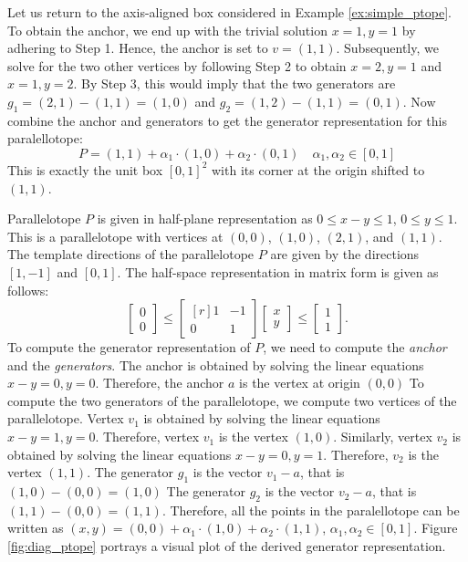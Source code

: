 \begin{example}
Let us return to the axis-aligned box considered in Example \ref{ex:simple_ptope}.
%
To obtain the anchor, we end up with the trivial solution $x = 1, y=1$ by adhering to Step 1. Hence, the anchor is set to $v = (1,1)$.
%
Subsequently, we solve for the two other vertices by following Step 2 to obtain $x=2, y= 1$ and $x=1,y=2$.
%
By Step 3, this would imply that the two generators are $g_1 = (2,1)-(1,1) = (1,0)$ and $g_2 = (1,2)-(1,1) = (0,1)$.
%
Now combine the anchor and generators to get the generator representation for this paralellotope:
%
\begin{equation}
 P = (1,1) + \alpha_1\cdot(1,0) + \alpha_2\cdot(0,1) \quad \alpha_1, \alpha_2 \in [0,1]
\end{equation}
%
This is exactly the unit box $[0,1]^2$ with its corner at the origin shifted to $(1,1)$.
\end{example}
%
\begin{example}
\label{ex:diag_ptope}
Parallelotope $P$ is given in half-plane representation as $0 \leq x-y \leq 1$, $0 \leq y \leq 1$.
%
This is a parallelotope with vertices at $(0,0)$, $(1,0)$, $(2,1)$, and $(1,1)$.
%
The template directions of the parallelotope $P$ are given by the directions $[1, -1]$ and $[0, 1]$.
%
The half-space representation in matrix form is given as follows:
%
\begin{equation}
  \begin{bmatrix} 0 \\ 0 \end{bmatrix} \leq \begin{bmatrix*}[r]  1 & -1 \\ 0 &  1 \end{bmatrix*}  \begin{bmatrix} x \\ y \end{bmatrix} \leq \begin{bmatrix} 1 \\ 1 \end{bmatrix}. \label{eq:ptopeexample}
\end{equation}
%
To compute the generator representation of $P$, we need to compute the \emph{anchor} and the \emph{generators}.
%
The anchor is obtained by solving the linear equations $x-y = 0, y = 0$.
%
Therefore, the anchor $a$ is the vertex at origin $(0,0)$
%
To compute the two generators of the parallelotope, we compute two vertices of the parallelotope.
%
Vertex $v_1$ is obtained by solving the linear equations $x - y = 1, y = 0$.
%
Therefore, vertex $v_1$ is the vertex $(1,0)$.
%
Similarly, vertex $v_2$ is obtained by solving the linear equations $x-y = 0, y = 1$.
%
Therefore, $v_2$ is the vertex $(1,1)$.
%
The generator $g_1$ is the vector $v_1 - a$, that is $(1,0)- (0,0) = (1,0)$
%
The generator $g_2$ is the vector $v_2 - a$, that is $(1,1) - (0,0) = (1,1)$.
%
Therefore, all the points in the paralellotope can be written as $(x,y) = (0,0) + \alpha_1 \cdot (1,0) + \alpha_2\cdot (1,1)$, $\alpha_1, \alpha_2 \in [0,1]$.
%
Figure \ref{fig:diag_ptope} portrays a visual plot of the derived generator representation.
\end{example}


